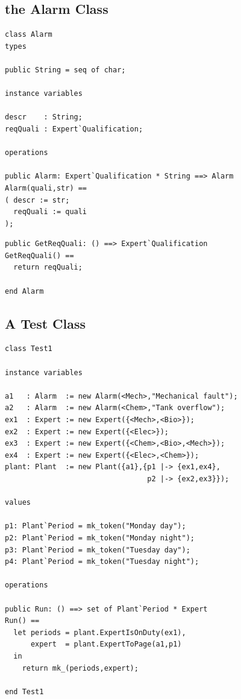 \subsection{the Alarm Class}

\begin{lstlisting}
class Alarm
types

public String = seq of char;

instance variables

descr    : String;
reqQuali : Expert`Qualification;

operations

public Alarm: Expert`Qualification * String ==> Alarm
Alarm(quali,str) ==
( descr := str;
  reqQuali := quali
);
\end{lstlisting}

\begin{lstlisting}
public GetReqQuali: () ==> Expert`Qualification
GetReqQuali() ==
  return reqQuali;

end Alarm
\end{lstlisting}

\subsection{A Test Class}

\begin{lstlisting}
class Test1

instance variables

a1   : Alarm  := new Alarm(<Mech>,"Mechanical fault");
a2   : Alarm  := new Alarm(<Chem>,"Tank overflow");
ex1  : Expert := new Expert({<Mech>,<Bio>});
ex2  : Expert := new Expert({<Elec>});
ex3  : Expert := new Expert({<Chem>,<Bio>,<Mech>});
ex4  : Expert := new Expert({<Elec>,<Chem>});
plant: Plant  := new Plant({a1},{p1 |-> {ex1,ex4},
                                 p2 |-> {ex2,ex3}});

values

p1: Plant`Period = mk_token("Monday day");
p2: Plant`Period = mk_token("Monday night");
p3: Plant`Period = mk_token("Tuesday day");
p4: Plant`Period = mk_token("Tuesday night");

operations

public Run: () ==> set of Plant`Period * Expert
Run() ==
  let periods = plant.ExpertIsOnDuty(ex1),
      expert  = plant.ExpertToPage(a1,p1)
  in
    return mk_(periods,expert);

end Test1
\end{lstlisting}



